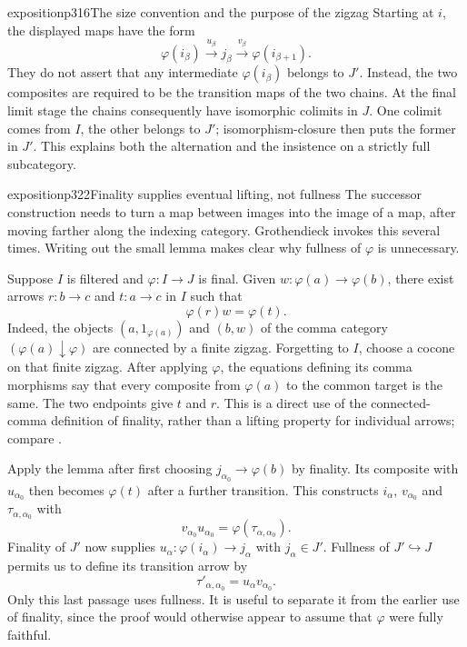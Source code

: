 \begin{dcomment}{exposition}{p316}{The size convention and the purpose of the zigzag}
Starting at $i$, the displayed maps have the form
\[
 \varphi(i_\beta)\xrightarrow{u_\beta}j_\beta
 \xrightarrow{v_\beta}\varphi(i_{\beta+1}).
\]
They do not assert that any intermediate $\varphi(i_\beta)$ belongs to $J'$. Instead, the two composites are required to be the transition maps of the two chains. At the final limit stage the chains consequently have isomorphic colimits in $J$. One colimit comes from $I$, the other belongs to $J'$; isomorphism-closure then puts the former in $J'$. This explains both the alternation and the insistence on a strictly full subcategory.
\end{dcomment}

\begin{dcomment}{exposition}{p322}{Finality supplies eventual lifting, not fullness}
The successor construction needs to turn a map between images into the image of a map, after moving farther along the indexing category. Grothendieck invokes this several times. Writing out the small lemma makes clear why fullness of $\varphi$ is unnecessary.

Suppose $I$ is filtered and $\varphi:I\to J$ is final. Given $w:\varphi(a)\to\varphi(b)$, there exist arrows $r:b\to c$ and $t:a\to c$ in $I$ such that
\[
                  \varphi(r)w=\varphi(t).
\]
Indeed, the objects $(a,1_{\varphi(a)})$ and $(b,w)$ of the comma category $(\varphi(a)\downarrow\varphi)$ are connected by a finite zigzag. Forgetting to $I$, choose a cocone on that finite zigzag. After applying $\varphi$, the equations defining its comma morphisms say that every composite from $\varphi(a)$ to the common target is the same. The two endpoints give $t$ and $r$. This is a direct use of the connected-comma definition of finality, rather than a lifting property for individual arrows; compare \citet[Definition 4.17.1]{StacksCofinal}.

Apply the lemma after first choosing $j_{\alpha_0}\to\varphi(b)$ by finality. Its composite with $u_{\alpha_0}$ then becomes $\varphi(t)$ after a further transition. This constructs $i_\alpha$, $v_{\alpha_0}$ and $\tau_{\alpha,\alpha_0}$ with
\[
v_{\alpha_0}u_{\alpha_0}=\varphi(\tau_{\alpha,\alpha_0}).
\]
Finality of $J'$ now supplies $u_\alpha:\varphi(i_\alpha)\to j_\alpha$ with $j_\alpha\in J'$. Fullness of $J'\hookrightarrow J$ permits us to define its transition arrow by
\[
\tau'_{\alpha,\alpha_0}=u_\alpha v_{\alpha_0}.
\]
Only this last passage uses fullness. It is useful to separate it from the earlier use of finality, since the proof would otherwise appear to assume that $\varphi$ were fully faithful.
\end{dcomment}


